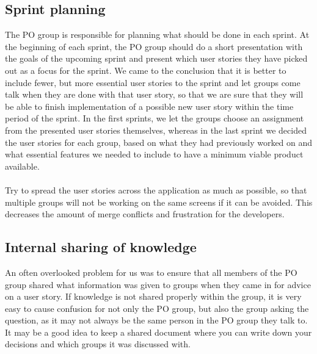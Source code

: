\subsection{Sprint planning}
The PO group is responsible for planning what should be done in each sprint.
At the beginning of each sprint, the PO group should do a short presentation with the goals of the upcoming sprint and present which user stories they have picked out as a focus for the sprint.
We came to the conclusion that it is better to include fewer, but more essential user stories to the sprint and let groups come talk when they are done with that user story, so that we are sure that they will be able to finish implementation of a possible new user story within the time period of the sprint.
In the first sprints, we let the groups choose an assignment from the presented user stories themselves, whereas in the last sprint we decided the user stories for each group, based on what they had previously worked on and what essential features we needed to include to have a minimum viable product available.
\\\\
Try to spread the user stories across the application as much as possible, so that multiple groups will not be working on the same screens if it can be avoided.
This decreases the amount of merge conflicts and frustration for the developers.

\subsection{Internal sharing of knowledge}
An often overlooked problem for us was to ensure that all members of the PO group shared what information was given to groups when they came in for advice on a user story.
If knowledge is not shared properly within the group, it is very easy to cause confusion for not only the PO group, but also the group asking the question, as it may not always be the same person in the PO group they talk to.
It may be a good idea to keep a shared document where you can write down your decisions and which groups it was discussed with.
